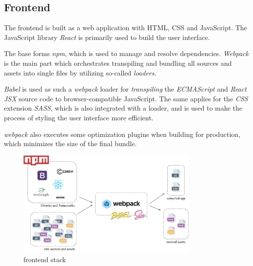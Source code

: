 \documentclass[a4paper,12pt,pdftex,halfparskip,cleardoubleempty,bibtotoc,liststotoc]{scrbook}
\begin{document}
\subsection{Frontend}
The frontend is built as a web application with HTML, CSS and JavaScript.
The JavaScript library \textit{React} is primarily used to build the user interface.

The base forms \textit{npm}, which is used to manage and resolve dependencies.  \textit{Webpack} is the main part which orchestrates transpiling and bundling all sources and assets into single files by utilizing so-called \textit{loaders}.

\textit{Babel} is used as such a \textit{webpack} loader for \textit{transpiling} the \textit{ECMAScript} and \textit{React JSX} source code to browser-compatible JavaScript.
The same applies for the \textit{CSS} extension \textit{SASS}, which is also integrated with a loader, and is used to make the process of styling the user interface more efficient.

\textit{webpack} also executes some optimization plugins when building for production, which minimizes the size of the final bundle.

\begin{figure}[H]
  \centering
  \vspace{0.8cm}
  \includegraphics[width=0.8\textwidth]{frontend-setup}
  \caption{frontend stack}
\end{figure}
\end{document}
